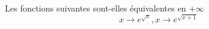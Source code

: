 Les fonctions suivantes sont-elles \'{e}quivalentes en $+\infty$
\[x\rightarrow e^{\sqrt{x}}, x\rightarrow e^{\sqrt{x+1}}\]
\bigskip